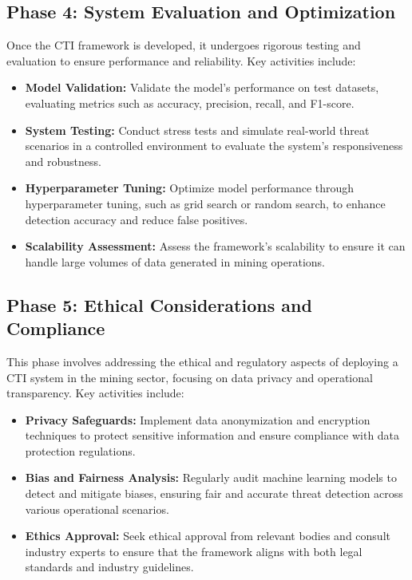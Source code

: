 \documentclass[a4paper,twoside,12pt]{report}
\begin{document}
\subsection{Phase 4: System Evaluation and Optimization}
Once the CTI framework is developed, it undergoes rigorous testing and evaluation to ensure performance and reliability. Key activities include:
\begin{itemize}
    \item \textbf{Model Validation:} Validate the model’s performance on test datasets, evaluating metrics such as accuracy, precision, recall, and F1-score.
    \item \textbf{System Testing:} Conduct stress tests and simulate real-world threat scenarios in a controlled environment to evaluate the system’s responsiveness and robustness.
    \item \textbf{Hyperparameter Tuning:} Optimize model performance through hyperparameter tuning, such as grid search or random search, to enhance detection accuracy and reduce false positives.
    \item \textbf{Scalability Assessment:} Assess the framework’s scalability to ensure it can handle large volumes of data generated in mining operations.
\end{itemize}

\subsection{Phase 5: Ethical Considerations and Compliance}
This phase involves addressing the ethical and regulatory aspects of deploying a CTI system in the mining sector, focusing on data privacy and operational transparency. Key activities include:
\begin{itemize}
    \item \textbf{Privacy Safeguards:} Implement data anonymization and encryption techniques to protect sensitive information and ensure compliance with data protection regulations.
    \item \textbf{Bias and Fairness Analysis:} Regularly audit machine learning models to detect and mitigate biases, ensuring fair and accurate threat detection across various operational scenarios.
    \item \textbf{Ethics Approval:} Seek ethical approval from relevant bodies and consult industry experts to ensure that the framework aligns with both legal standards and industry guidelines.
\end{itemize}
\end{document}
